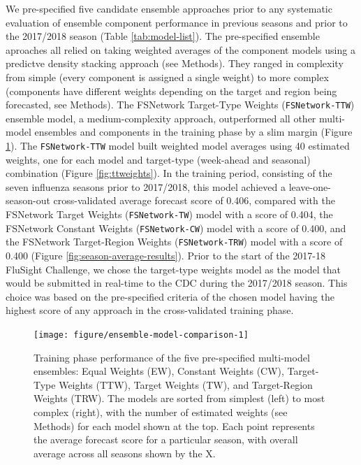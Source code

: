 \documentclass{article}\usepackage[]{graphicx}\usepackage[]{color}
\newenvironment{knitrout}{}{} %
\begin{document}
We pre-specified five candidate ensemble approaches prior to any systematic evaluation of ensemble component performance in previous seasons and prior to the 2017/2018 season (Table \ref{tab:model-list}).\cite{Reich2017github} 
The pre-specified ensemble aproaches all relied on taking weighted averages of the component models using a predictve density stacking approach (see Methods).
They ranged in complexity from simple (every component is assigned a single weight) to more complex (components have different weights depending on the target and region being forecasted, see Methods).
The FSNetwork Target-Type Weights ({\tt FSNetwork-TTW}) ensemble model, a medium-complexity approach, outperformed all other multi-model ensembles and components in the training phase by a slim margin (Figure \ref{fig:ensemble-model-comparison}). 
The {\tt FSNetwork-TTW} model built weighted model averages using 40 estimated weights, one for each model and target-type (week-ahead and seasonal) combination (Figure \ref{fig:ttweights}).
In the training period, consisting of the seven influenza seasons prior to 2017/2018, this model achieved a leave-one-season-out cross-validated average forecast score of 
0.406, 
compared with 
the FSNetwork Target Weights ({\tt FSNetwork-TW}) model with a score of 0.404, 
the FSNetwork Constant Weights ({\tt FSNetwork-CW}) model with a score of 0.400, and 
the FSNetwork Target-Region Weights ({\tt FSNetwork-TRW}) model with a score of 0.400 (Figure \ref{fig:season-average-results}).
Prior to the start of the 2017-18 FluSight Challenge, we chose the target-type weights model as the model that would be submitted in real-time to the CDC during the 2017/2018 season. 
This choice was based on the pre-specified criteria of the chosen model having the highest score of any approach in the cross-validated training phase.\cite{Reich2017github}

\begin{knitrout}
\color{fgcolor}\begin{figure}
\texttt{[image: figure/ensemble-model-comparison-1]} \caption[Training phase performance of the five pre-specified multi-model ensembles]{Training phase performance of the five pre-specified multi-model ensembles: Equal Weights (EW), Constant Weights (CW), Target-Type Weights (TTW), Target Weights (TW), and Target-Region Weights (TRW). The models are sorted from simplest (left) to most complex (right), with the number of estimated weights (see Methods) for each model shown at the top. Each point represents the average forecast score for a particular season, with overall average across all seasons shown by the X. }\label{fig:ensemble-model-comparison}
\end{figure}


\end{knitrout}
\end{document}

